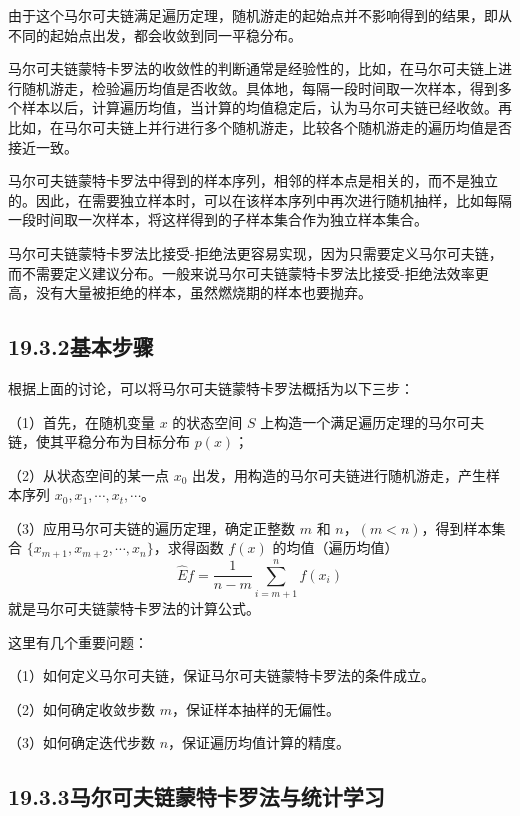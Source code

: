 \documentclass[UTF8, 12pt, fontset=fandol, oneside]{ctexart}
\begin{document}
由于这个马尔可夫链满足遍历定理，随机游走的起始点并不影响得到的结果，即从不同的起始点出发，都会收敛到同一平稳分布。

马尔可夫链蒙特卡罗法的收敛性的判断通常是经验性的，比如，在马尔可夫链上进行随机游走，检验遍历均值是否收敛。具体地，每隔一段时间取一次样本，得到多个样本以后，计算遍历均值，当计算的均值稳定后，认为马尔可夫链已经收敛。再比如，在马尔可夫链上并行进行多个随机游走，比较各个随机游走的遍历均值是否接近一致。

马尔可夫链蒙特卡罗法中得到的样本序列，相邻的样本点是相关的，而不是独立的。因此，在需要独立样本时，可以在该样本序列中再次进行随机抽样，比如每隔一段时间取一次样本，将这样得到的子样本集合作为独立样本集合。

马尔可夫链蒙特卡罗法比接受-拒绝法更容易实现，因为只需要定义马尔可夫链，而不需要定义建议分布。一般来说马尔可夫链蒙特卡罗法比接受-拒绝法效率更高，没有大量被拒绝的样本，虽然燃烧期的样本也要抛弃。

\subsection*{19.3.2\quad 基本步骤}

根据上面的讨论，可以将马尔可夫链蒙特卡罗法概括为以下三步：

（1）首先，在随机变量 $x$ 的状态空间 $S$ 上构造一个满足遍历定理的马尔可夫链，使其平稳分布为目标分布 $p(x)$；

（2）从状态空间的某一点 $x_0$ 出发，用构造的马尔可夫链进行随机游走，产生样本序列 $x_0,x_1,\cdots,x_t,\cdots$。

（3）应用马尔可夫链的遍历定理，确定正整数 $m$ 和 $n$，$(m<n)$，得到样本集合 $\{x_{m+1},x_{m+2},\cdots,x_n\}$，求得函数 $f(x)$ 的均值（遍历均值）
\begin{equation}
\hat E f=\frac{1}{n-m}\sum_{i=m+1}^{n}f(x_i)
\tag{19.33}
\end{equation}
就是马尔可夫链蒙特卡罗法的计算公式。

这里有几个重要问题：

（1）如何定义马尔可夫链，保证马尔可夫链蒙特卡罗法的条件成立。

（2）如何确定收敛步数 $m$，保证样本抽样的无偏性。

（3）如何确定迭代步数 $n$，保证遍历均值计算的精度。

\subsection*{19.3.3\quad 马尔可夫链蒙特卡罗法与统计学习}
\end{document}
